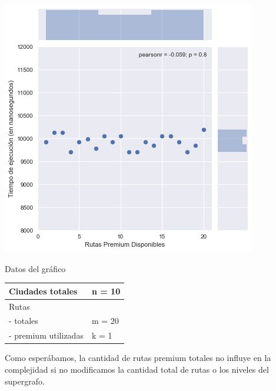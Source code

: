 \noindent
\begin{minipage}{0.55\textwidth}
	\hfill
	\includegraphics[scale=0.65]{imagenes/ej1-3.png}
\end{minipage}
\hfill
\begin{minipage}{0.42\textwidth}
	\begin{center}
		Datos del gráfico

		\begin{tabular}{ | l l |}
			\hline
			Ciudades totales & n = 10 \\ \hline
			Rutas & \\
			- totales & m = 20 \\
			- premium utilizadas & k = 1 \\
			\hline
		\end{tabular}
	\end{center}
\end{minipage}

Como esperábamos, la cantidad de rutas premium totales no influye en la complejidad si no modificamos la cantidad total de rutas o los niveles del supergrafo.

